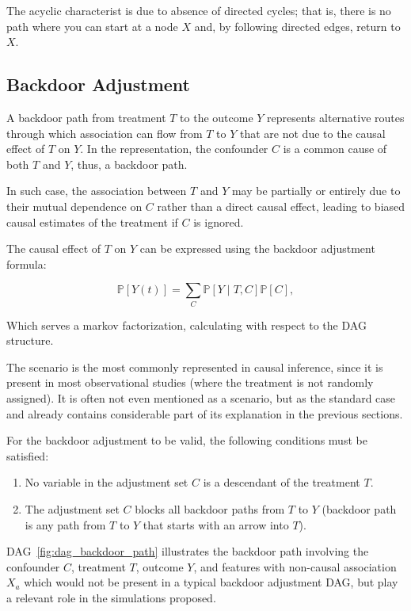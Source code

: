 \documentclass{article}
\numberwithin{equation}{section}
\begin{document}
The acyclic characterist is due to absence of directed cycles; that is, there is no path where you can start at a node $X$ and, by following directed edges, return to $X$.

\subsection{Backdoor Adjustment}

A backdoor path from treatment $T$ to the outcome $Y$ represents alternative routes through which association can flow from $T$ to $Y$ that are not due to the causal effect of $T$ on $Y$. In the representation, the confounder $C$ is a common cause of both $T$ and $Y$, thus, a backdoor path.

In such case, the association between $T$ and $Y$ may be partially or entirely due to their mutual dependence on $C$ rather than a direct causal effect, leading to biased causal estimates of the treatment if $C$ is ignored.

The causal effect of $T$ on $Y$ can be expressed using the backdoor adjustment formula:

\begin{equation}
    \mathbb{P}[Y(t)] = \sum_C \mathbb{P}[Y \mid T, C] \mathbb{P}[C],
\end{equation}

Which serves a markov factorization, calculating with respect to the DAG structure.

The scenario is the most commonly represented in causal inference, since it is present in most observational studies (where the treatment is not randomly assigned). It is often not even mentioned as a scenario, but as the standard case and already contains considerable part of its explanation in the previous sections.

For the backdoor adjustment to be valid, the following conditions must be satisfied:

\begin{enumerate}
    \item No variable in the adjustment set $C$ is a descendant of the treatment $T$.
    \item The adjustment set $C$ blocks all backdoor paths from $T$ to $Y$ (backdoor path is any path from $T$ to $Y$ that starts with an arrow into $T$).
\end{enumerate}

DAG~\ref{fig:dag_backdoor_path} illustrates the backdoor path involving the confounder $C$, treatment $T$, outcome $Y$, and features with non-causal association $X_a$ which would not be present in a typical backdoor adjustment DAG, but play a relevant role in the simulations proposed.
\end{document}
